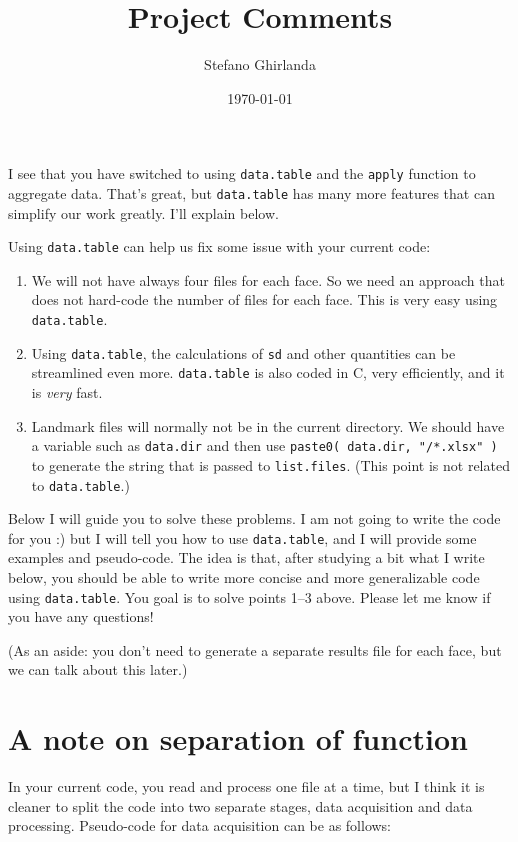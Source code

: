 \documentclass[11pt]{article}
\author{Stefano Ghirlanda}
\date{\today}
\title{Project Comments}
\begin{document}
\maketitle
\setlength{\parindent}{0pt}
\setlength{\parskip}{2ex}

I see that you have switched to using \verb~data.table~ and the \verb~apply~
function to aggregate data. That's great, but \verb~data.table~ has many
more features that can simplify our work greatly. I'll explain
below. 

Using \verb~data.table~ can help us fix some issue with your current code:

\begin{enumerate}
\item We will not have always four files for each face. So we need an
approach that does not hard-code the number of files for each
face. This is very easy using \verb~data.table~.

\item Using \verb~data.table~, the calculations of \verb~sd~ and other quantities
can be streamlined even more. \verb~data.table~ is also coded in C, very
efficiently, and it is \emph{very} fast.

\item Landmark files will normally not be in the current directory. We
should have a variable such as \verb~data.dir~ and then use 
\verb~paste0( data.dir, "/*.xlsx" )~ to generate the string that is
passed to \verb~list.files~. (This point is not related to \verb~data.table~.)
\end{enumerate}

Below I will guide you to solve these problems. I am not going to
write the code for you :) but I will tell you how to use \verb~data.table~,
and I will provide some examples and pseudo-code. The idea is that,
after studying a bit what I write below, you should be able to write
more concise and more generalizable code using \verb~data.table~. You goal
is to solve points 1--3 above. Please let me know if you have any
questions!

(As an aside: you don't need to generate a separate results file for
each face, but we can talk about this later.)

\section*{A note on separation of function}
\label{sec-1}

In your current code, you read and process one file at a time, but I
think it is cleaner to split the code into two separate stages, data
acquisition and data processing. Pseudo-code for data acquisition can
be as follows:
\end{document}
